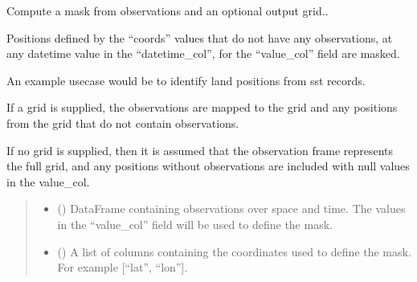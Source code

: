 \documentclass[letterpaper,10pt,english]{sphinxmanual}
\begin{document}
\begin{fulllineitems}
\label{\detokenize{misc:glomar_gridding.mask.mask_from_obs_frame}}
\pysigstartsignatures
\pysiglinewithargsret
{}
{\sphinxparamcomma {}\sphinxparamcomma {}\sphinxparamcomma {}\sphinxparamcomma {}\sphinxparamcomma {}}
{}
\pysigstopsignatures
\sphinxAtStartPar
Compute a mask from observations and an optional output grid..

\sphinxAtStartPar
Positions defined by the “coords” values that do not have any observations,
at any datetime value in the “datetime\_col”, for the “value\_col” field are
masked.

\sphinxAtStartPar
An example use\sphinxhyphen{}case would be to identify land positions from sst records.

\sphinxAtStartPar
If a grid is supplied, the observations are mapped to the grid and any
positions from the grid that do not contain observations.

\sphinxAtStartPar
If no grid is supplied, then it is assumed that the observation frame
represents the full grid, and any positions without observations are
included with null values in the value\_col.
\begin{quote}\begin{description}
\begin{itemize}
\item {}
\sphinxAtStartPar
{} () \textendash{} DataFrame containing observations over space and time. The values in
the “value\_col” field will be used to define the mask.

\item {}
\sphinxAtStartPar
{} (\sphinxstyleliteralemphasis{\sphinxupquote{ | }}\sphinxstyleliteralemphasis{\sphinxupquote{{[}}}\sphinxstyleliteralemphasis{\sphinxupquote{{]}}}) \textendash{} A list of columns containing the coordinates used to define the mask.
For example {[}“lat”, “lon”{]}.


\end{itemize}
\end{description}
\end{quote}
\end{fulllineitems}
\end{document}
